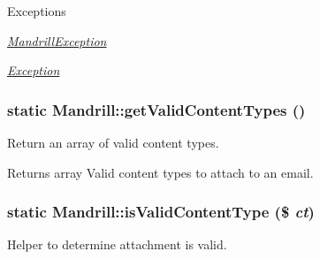 \begin{DoxyExceptions}{Exceptions}
\item[{\em \hyperlink{classMandrillException}{MandrillException}}]\item[{\em \hyperlink{classException}{Exception}}]\end{DoxyExceptions}
\hypertarget{classMandrill_aa3462b61a5d844683f4fdf0f0068869f}{
\subsubsection[{getValidContentTypes}]{\setlength{\rightskip}{0pt plus 5cm}static Mandrill::getValidContentTypes ()}}
\label{classMandrill_aa3462b61a5d844683f4fdf0f0068869f}
Return an array of valid content types.

\begin{DoxyReturn}{Returns}
array Valid content types to attach to an email. 
\end{DoxyReturn}
\hypertarget{classMandrill_a8a6b67834236ab37ad0e5c83b7bd2695}{
\subsubsection[{isValidContentType}]{\setlength{\rightskip}{0pt plus 5cm}static Mandrill::isValidContentType (\$ {\em ct})}}
\label{classMandrill_a8a6b67834236ab37ad0e5c83b7bd2695}
Helper to determine attachment is valid.


